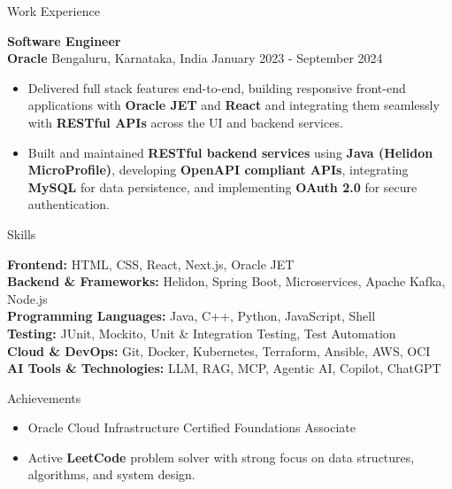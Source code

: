 \documentclass{resume}
\begin{document}
\begin{rSection}{Work Experience}
\vspace{6pt}

\textbf{Software Engineer} \\
\textbf{Oracle} \textbar{} Bengaluru, Karnataka, India \hspace*{\fill} January 2023 - September 2024
\vspace{-2pt}
\begin{itemize}
    \item Delivered full stack features end-to-end, building responsive front-end applications with \textbf{Oracle JET} and \textbf{React} and integrating them seamlessly with \textbf{RESTful APIs} across the UI and backend services.
    \item Built and maintained \textbf{RESTful backend services} using \textbf{Java (Helidon MicroProfile)}, developing \textbf{OpenAPI compliant APIs}, integrating \textbf{MySQL} for data persistence, and implementing \textbf{OAuth 2.0} for secure authentication.
\end{itemize}

\end{rSection}

\begin{rSection}{Skills}

\vspace{-2pt}
\textbf{Frontend:} HTML, CSS, React, Next.js, Oracle JET \\
\textbf{Backend \& Frameworks:} Helidon, Spring Boot, Microservices, Apache Kafka, Node.js \\
\textbf{Programming Languages:} Java, C++, Python, JavaScript, Shell \\
\textbf{Testing:} JUnit, Mockito, Unit \& Integration Testing, Test Automation \\
\textbf{Cloud \& DevOps:} Git, Docker, Kubernetes, Terraform, Ansible, AWS, OCI \\
\textbf{AI Tools \& Technologies:} LLM, RAG, MCP, Agentic AI, Copilot, ChatGPT

\end{rSection}

\begin{rSection}{Achievements}

\begin{itemize}
    \item Oracle Cloud Infrastructure Certified Foundations Associate
    \item Active \textbf{LeetCode} problem solver with strong focus on data structures, algorithms, and system design.
\end{itemize}

\end{rSection}
\end{document}
